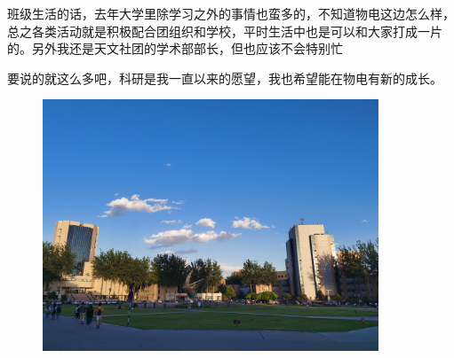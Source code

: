 \documentclass[hyperref,UTF8]{ctexart}
\begin{document}
班级生活的话，去年大学里除学习之外的事情也蛮多的，不知道物电这边怎么样，总之各类活动就是积极配合团组织和学校，平时生活中也是可以和大家打成一片的。另外我还是天文社团的学术部部长，但也应该不会特别忙

要说的就这么多吧，科研是我一直以来的愿望，我也希望能在物电有新的成长。
\begin{figure}[H]
    \centering
    \includegraphics[width=10cm]{IMG_20210526_190810.jpg}
\end{figure}
\end{document}
